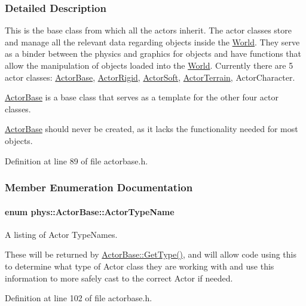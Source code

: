 \subsubsection{Detailed Description}
This is the base class from which all the actors inherit. The actor classes store and manage all the relevant data regarding objects inside the \hyperlink{classphys_1_1World}{World}. They serve as a binder between the physics and graphics for objects and have functions that allow the manipulation of objects loaded into the \hyperlink{classphys_1_1World}{World}. Currently there are 5 actor classes: \hyperlink{classphys_1_1ActorBase}{ActorBase}, \hyperlink{classphys_1_1ActorRigid}{ActorRigid}, \hyperlink{classphys_1_1ActorSoft}{ActorSoft}, \hyperlink{classphys_1_1ActorTerrain}{ActorTerrain}, ActorCharacter. \par
 \hyperlink{classphys_1_1ActorBase}{ActorBase} is a base class that serves as a template for the other four actor classes. \par
 \hyperlink{classphys_1_1ActorBase}{ActorBase} should never be created, as it lacks the functionality needed for most objects. 

Definition at line 89 of file actorbase.h.



\subsubsection{Member Enumeration Documentation}
\hypertarget{classphys_1_1ActorBase_aff3a7c464e8ce82576073f8f891434b7}{
\paragraph[{ActorTypeName}]{\setlength{\rightskip}{0pt plus 5cm}enum {\bf phys::ActorBase::ActorTypeName}}\hfill}
\label{d8/d0f/classphys_1_1ActorBase_aff3a7c464e8ce82576073f8f891434b7}


A listing of Actor TypeNames. 

These will be returned by \hyperlink{classphys_1_1ActorBase_ac631b0572fbcac6ac6dee3b0a8704c8e}{ActorBase::GetType()}, and will allow code using this to determine what type of Actor class they are working with and use this information to more safely cast to the correct Actor if needed. 

Definition at line 102 of file actorbase.h.



